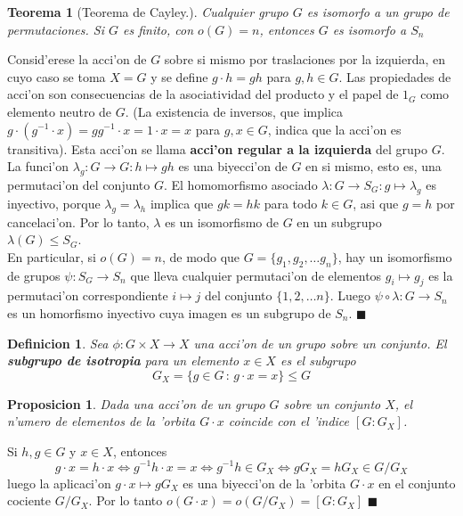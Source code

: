 \documentclass[a4paper,openright,12pt]{report}
\numberwithin{equation}{section} %
\newtheorem{teorema}{Teorema}[section] %
\newtheorem{proposicion}{Proposicion}[section] %
\newtheorem{definicion}{Definicion}[section] %
\newenvironment{proof}{\noindent{\it Demostracion:}}{\hfill$\blacksquare$} %
\begin{document}
\begin{teorema}[Teorema de Cayley.]
Cualquier grupo $G$ es isomorfo a un grupo de permutaciones. Si $G$ es finito, con $o(G)=n$, entonces $G$ es isomorfo a $S_{n}$
\end{teorema}
\begin{proof}
Consid'erese la acci'on de $G$ sobre si mismo por traslaciones por la izquierda, en cuyo caso se toma $X=G$ y se define $g \cdot h =gh$ para $g,h \in G$. Las propiedades de acci'on son consecuencias de la asociatividad del producto y el papel de $1_{G}$ como elemento neutro de $G$. (La existencia de inversos, que implica $g \cdot (g^{-1}\cdot x)=gg^{-1}\cdot x= 1 \cdot x =x$ para $g,x \in G$, indica que la acci'on es transitiva). Esta acci'on se llama \textbf{acci'on regular a la izquierda} del grupo $G$.\\
La funci'on $\lambda_{g}:G \rightarrow G : h \mapsto gh$ es una biyecci'on de $G$ en si mismo, esto es, una permutaci'on del conjunto $G$. El homomorfismo asociado $\lambda : G \rightarrow S_{G}: g \mapsto \lambda_{g}$ es inyectivo, porque $\lambda_{g}=\lambda_{h}$ implica que $gk=hk$ para todo $k \in G$, asi que $g=h$ por cancelaci'on. Por lo tanto, $\lambda$ es un isomorfismo de $G$ en un subgrupo $\lambda(G)\leq S_{G}$.\\
En particular, si $o(G)=n$, de modo que $G=\{g_{1},g_{2},\ldots g_{n}\}$, hay un isomorfismo de grupos $\psi : S_{G}\rightarrow S_{n}$ que lleva cualquier permutaci'on de elementos $g_{i}\mapsto g_{j}$ es la permutaci'on correspondiente $i \mapsto j$ del conjunto $\{1,2,\ldots n\}$. Luego $\psi \circ \lambda : G \rightarrow S_{n}$ es un homorfismo inyectivo cuya imagen es un subgrupo de $S_{n}$.
\end{proof}
\begin{definicion}
Sea $\phi : G \times X \rightarrow X$ una acci'on de un grupo sobre un conjunto. El \textbf{subgrupo de isotropia} para un elemento $x \in X$ es el subgrupo
\[
G_{X}=\{g \in G\,:\,g \cdot x = x  \} \leq G
\]
\end{definicion}
\begin{proposicion}
Dada una acci'on de un grupo $G$ sobre un conjunto $X$, el n'umero de elementos de la 'orbita $G \cdot x$ coincide con el 'indice $[G:G_{X}]$.
\end{proposicion}
\begin{proof}
Si $h,g \in G$ y $x \in X$, entonces
\[
g \cdot x = h \cdot x \Longleftrightarrow g^{-1}h \cdot x = x \Longleftrightarrow g^{-1}h \in G_{X} \Longleftrightarrow gG_{X} = hG_{X} \in G/G_{X}
\]
luego la aplicaci'on $g \cdot x \mapsto gG_{X}$ es una biyecci'on de la 'orbita $G \cdot x$ en el conjunto cociente $G/G_{X}$. Por lo tanto $o(G \cdot x)=o(G/G_ {X})=[G:G_{X}]$
\end{proof}
\end{document}
